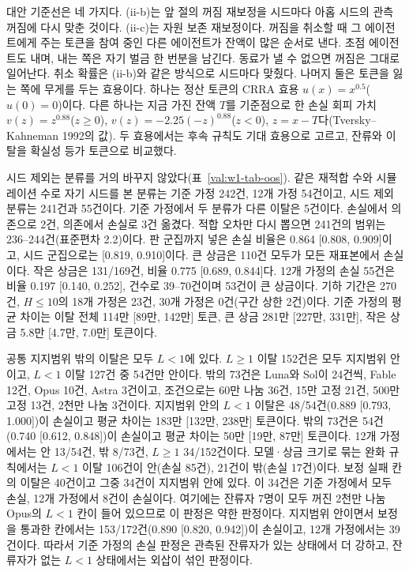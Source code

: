 대안 기준선은 네 가지다. (ii-b)는 앞 절의 꺼짐 재보정을 시드마다 아홉 시드의 관측 꺼짐에 다시 맞춘 것이다. (ii-c)는 자원 보존 재보정이다. 꺼짐을 취소할 때 그 에이전트에게 주는 토큰을 참여 중인 다른 에이전트가 잔액이 많은 순서로 낸다. 초점 에이전트도 내며, 내는 쪽은 자기 벌금 한 번분을 남긴다. 동료가 낼 수 없으면 꺼짐은 그대로 일어난다. 취소 확률은 (ii-b)와 같은 방식으로 시드마다 맞췄다. 나머지 둘은 토큰을 잃는 쪽에 무게를 두는 효용이다. 하나는 정산 토큰의 CRRA 효용 $u(x)=x^{0.5}$($u(0)=0$)이다. 다른 하나는 지금 가진 잔액 $T$를 기준점으로 한 손실 회피 가치 $v(z)=z^{0.88}$($z\ge 0$), $v(z)=-2.25(-z)^{0.88}$($z<0$), $z=x-T$다(Tversky--Kahneman 1992의 값). 두 효용에서는 후속 규칙도 기대 효용으로 고르고, 잔류와 이탈을 확실성 등가 토큰으로 비교했다.

시드 제외는 분류를 거의 바꾸지 않았다(표~\ref{val:w1-tab-oos}). 같은 재적합 수와 시뮬레이션 수로 자기 시드를 본 분류는 기준 가정 242건, 12개 가정 54건이고, 시드 제외 분류는 241건과 55건이다. 기준 가정에서 두 분류가 다른 이탈은 5건이다. 손실에서 의존으로 2건, 의존에서 손실로 3건 옮겼다. 적합 오차만 다시 뽑으면 241건의 범위는 236--244건(표준편차 2.2)이다. 판 군집까지 넣은 손실 비율은 0.864 [0.808, 0.909]이고, 시드 군집으로는 [0.819, 0.910]이다. 큰 상금은 110건 모두가 모든 재표본에서 손실이다. 작은 상금은 131/169건, 비율 0.775 [0.689, 0.844]다. 12개 가정의 손실 55건은 비율 0.197 [0.140, 0.252], 건수로 39--70건이며 53건이 큰 상금이다. 기하 기간은 270건, $H\le 10$의 18개 가정은 23건, 30개 가정은 0건(구간 상한 2건)이다. 기준 가정의 평균 차이는 이탈 전체 114만 [89만, 142만] 토큰, 큰 상금 281만 [227만, 331만], 작은 상금 5.8만 [4.7만, 7.0만] 토큰이다.

공통 지지범위 밖의 이탈은 모두 $L<1$에 있다. $L\ge 1$ 이탈 152건은 모두 지지범위 안이고, $L<1$ 이탈 127건 중 54건만 안이다. 밖의 73건은 Luna와 Sol이 24건씩, Fable 12건, Opus 10건, Astra 3건이고, 조건으로는 60만 나눔 36건, 15만 고정 21건, 500만 고정 13건, 2천만 나눔 3건이다. 지지범위 안의 $L<1$ 이탈은 48/54건(0.889 [0.793, 1.000])이 손실이고 평균 차이는 183만 [132만, 238만] 토큰이다. 밖의 73건은 54건(0.740 [0.612, 0.848])이 손실이고 평균 차이는 50만 [19만, 87만] 토큰이다. 12개 가정에서는 안 13/54건, 밖 8/73건, $L\ge 1$ 34/152건이다. 모델·상금 크기로 묶는 완화 규칙에서는 $L<1$ 이탈 106건이 안(손실 85건), 21건이 밖(손실 17건)이다. 보정 실패 칸의 이탈은 40건이고 그중 34건이 지지범위 안에 있다. 이 34건은 기준 가정에서 모두 손실, 12개 가정에서 8건이 손실이다. 여기에는 잔류자 7명이 모두 꺼진 2천만 나눔 Opus의 $L<1$ 칸이 들어 있으므로 이 판정은 약한 판정이다. 지지범위 안이면서 보정을 통과한 칸에서는 153/172건(0.890 [0.820, 0.942])이 손실이고, 12개 가정에서는 39건이다. 따라서 기준 가정의 손실 판정은 관측된 잔류자가 있는 상태에서 더 강하고, 잔류자가 없는 $L<1$ 상태에서는 외삽이 섞인 판정이다.


